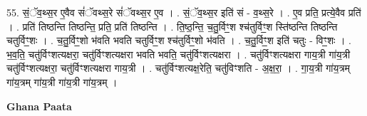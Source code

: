 \documentclass[17pt]{extarticle}
\begin{document}
55. सं॒ॅव॒थ्स॒र ए॒वैव सं॑ॅवथ्स॒रे सं॑ॅवथ्स॒र ए॒व । . सं॒ॅव॒थ्स॒र इति॑ सं - व॒थ्स॒रे । . ए॒व प्रति॒ प्रत्ये॒वैव प्रति॑ । . प्रति॑ तिष्ठन्ति तिष्ठन्ति॒ प्रति॒ प्रति॑ तिष्ठन्ति । . ति॒ष्ठ॒न्ति॒ च॒तु॒र्विꣳ॒॒श श्च॑तुर्विꣳ॒॒श स्ति॑ष्ठन्ति तिष्ठन्ति चतुर्विꣳ॒॒शः । . च॒तु॒र्विꣳ॒॒शो भ॑वति भवति चतुर्विꣳ॒॒श श्च॑तुर्विꣳ॒॒शो भ॑वति । . च॒तु॒र्विꣳ॒॒श इति॑ चतुः - विꣳ॒॒शः । . भ॒व॒ति॒ चतु॑र्विꣳशत्यक्षरा॒ चतु॑र्विꣳशत्यक्षरा भवति भवति॒ चतु॑र्विꣳशत्यक्षरा । . चतु॑र्विꣳशत्यक्षरा गाय॒त्री गा॑य॒त्री चतु॑र्विꣳशत्यक्षरा॒ चतु॑र्विꣳशत्यक्षरा गाय॒त्री । . चतु॑र्विꣳशत्यक्ष॒रेति॒ चतु॑विꣳशति - अ॒क्ष॒रा॒ । . गा॒य॒त्री गा॑य॒त्रम् गा॑य॒त्रम् गा॑य॒त्री गा॑य॒त्री गा॑य॒त्रम् । \newline

\textbf{Ghana Paata } \newline
\end{document}
